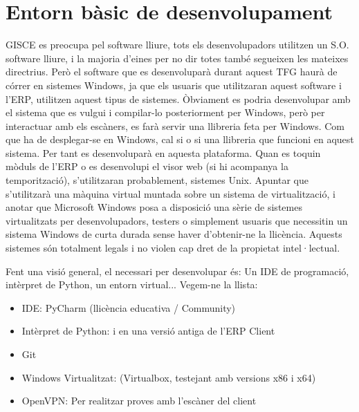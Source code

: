 \documentclass[letterpaper,11pt,catalan]{sphinxmanual}
\begin{document}
\section{Entorn bàsic de desenvolupament}
\label{\detokenize{index:entorn-basic-de-desenvolupament}}
GISCE es preocupa pel software lliure, tots els desenvolupadors
utilitzen un S.O. software lliure, i la majoria d'eines per no dir totes també segueixen
les mateixes directrius. Però el software que es desenvoluparà durant aquest TFG haurà de
córrer en sistemes Windows, ja que els usuaris que utilitzaran aquest software
i l'ERP, utilitzen aquest tipus de sistemes. Òbviament es podria desenvolupar amb el
sistema que es vulgui i compilar-lo posteriorment per Windows, però per interactuar amb
els escàners, es farà servir una llibreria feta per Windows. Com que ha de desplegar-se
en Windows, cal si o si una llibreria que funcioni en aquest sistema. Per tant es desenvoluparà en aquesta plataforma. Quan es toquin mòduls de l'ERP o es desenvolupi
el visor web (si hi acompanya la temporització), s'utilitzaran probablement, sistemes Unix.
Apuntar que s'utilitzarà una màquina virtual muntada sobre un sistema
de virtualització, i anotar que Microsoft Windows posa a disposició una sèrie de sistemes
virtualitzats per desenvolupadors, testers o simplement usuaris que necessitin un sistema
Windows de curta durada sense haver d'obtenir-ne la llicència. Aquests sistemes són
totalment legals i no violen cap dret de la propietat intel·lectual.


Fent una visió general, el  necessari per desenvolupar és: Un IDE de programació,
intèrpret de Python, un entorn virtual... Vegem-ne la llista:
\begin{itemize}
\item {} 
IDE: PyCharm (llicència educativa / Community)

\item {} 
Intèrpret de Python:  i  en una versió antiga de l'ERP Client

\item {} 
Git

\item {} 
Windows Virtualitzat: (Virtualbox, testejant amb versions x86 i x64)

\item {} 
OpenVPN: Per realitzar proves amb l'escàner del client

\end{itemize}
\end{document}
